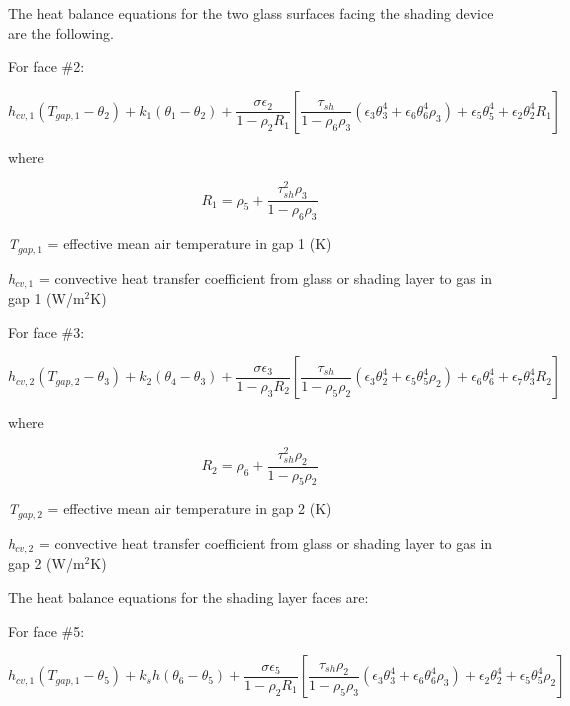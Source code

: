 The heat balance equations for the two glass surfaces facing the shading device are the following.

For face \#2:

\begin{equation}
h_{cv,1} (T_{gap,1}-\theta_2) + k_1 (\theta_1-\theta_2) +
    \frac{\sigma \epsilon_2}{1-\rho_2 R_1} \left[
      \frac{\tau_{sh}}{1-\rho_6\rho_3} (
        \epsilon_3 \theta_3^4 + \epsilon_6\theta_6^4\rho_3
      )
      + \epsilon_5\theta_5^4 + \epsilon_2\theta_2^4R_1
    \right]
\end{equation}

where

\begin{equation}
{R_1} = {\rho_5} + \frac{{\tau_{sh}^2{\rho_3}}}{{1 - {\rho_6}{\rho_3}}}
\end{equation}

\emph{T\(_{gap,1}\)} = effective mean air temperature in gap 1 (K)

\emph{h\(_{cv,1}\)} = convective heat transfer coefficient from glass or shading layer to gas in gap 1 (W/m\(^{2}\)K)

For face \#3:

\begin{equation}
h_{cv,2} (T_{gap,2}-\theta_3) + k_2 (\theta_4-\theta_3) +
    \frac{\sigma \epsilon_3}{1-\rho_3 R_2} \left[
      \frac{\tau_{sh}}{1-\rho_5\rho_2} (
        \epsilon_3 \theta_2^4 + \epsilon_5\theta_5^4\rho_2
      )
      + \epsilon_6\theta_6^4 + \epsilon_7\theta_3^4R_2
    \right]
\end{equation}

where

\begin{equation}
{R_2} = {\rho_6} + \frac{{\tau_{sh}^2{\rho_2}}}{{1 - {\rho_5}{\rho_2}}}
\end{equation}

\emph{T\(_{gap,2}\)} = effective mean air temperature in gap 2 (K)

\emph{h\(_{cv,2}\)} = convective heat transfer coefficient from glass or shading layer to gas in gap 2 (W/m\(^{2}\)K)

The heat balance equations for the shading layer faces are:

For face \#5:

\begin{equation}
h_{cv,1} (T_{gap,1}-\theta_5) + k_sh (\theta_6-\theta_5) +
    \frac{\sigma \epsilon_5}{1-\rho_2 R_1} \left[
      \frac{\tau_{sh}\rho_2}{1-\rho_5\rho_3} (
        \epsilon_3 \theta_3^4 + \epsilon_6\theta_6^4\rho_3
      )
      + \epsilon_2\theta_2^4 + \epsilon_5\theta_5^4\rho_2
    \right]
\end{equation}

